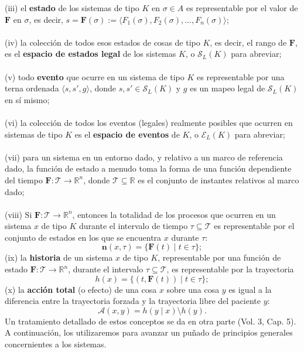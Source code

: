 {(iii) el \textbf{estado} de los sistemas de tipo $K$ en $\sigma \in A$ es representable por el valor de $\mathbf{F}$ en $\sigma$, es decir, $s = \mathbf{F}(\sigma) := \langle F_1(\sigma), F_2(\sigma), \ldots, F_n(\sigma) \rangle$;
\\\\
(iv) la colección de todos esos estados de cosas de tipo $K$, es decir, el rango de $\mathbf{F}$, es el \textbf{espacio de estados legal} de los sistemas $K$, o $\mathcal{S}_L(K)$ para abreviar;
\\\\
(v) todo \textbf{evento} que ocurre en un sistema de tipo $K$ es representable por una terna ordenada $\langle s, s', g \rangle$, donde $s, s' \in \mathcal{S}_L(K)$ y $g$ es un mapeo legal de $\mathcal{S}_L(K)$ en sí mismo;
\\\\
(vi) la colección de todos los eventos (legales) realmente posibles que ocurren en sistemas de tipo $K$ es el \textbf{espacio de eventos} de $K$, o $\mathcal{E}_L(K)$ para abreviar;
\\\\
(vii) para un sistema en un entorno dado, y relativo a un marco de referencia dado, la función de estado a menudo toma la forma de una función dependiente del tiempo $\mathbf{F}: \mathcal{T} \rightarrow \mathbb{R}^n$, donde $\mathcal{T} \subseteq \mathbb{R}$ es el conjunto de instantes relativos al marco dado;
\\\\
(viii) Si $\mathbf{F}: \mathcal{T} \rightarrow \mathbb{R}^n$, entonces la totalidad de los procesos que ocurren en un sistema $x$ de tipo $K$ durante el intervalo de tiempo $\tau \subseteq \mathcal{T}$ es representable por el conjunto de estados en los que se encuentra $x$ durante $\tau$:
$$ \mathbf{n}(x, \tau) = \{\mathbf{F}(t) \mid t \in \tau\}; $$
(ix) la \textbf{historia} de un sistema $x$ de tipo $K$, representable por una función de estado $\mathbf{F}: \mathcal{T} \rightarrow \mathbb{R}^n$, durante el intervalo $\tau \subseteq \mathcal{T}$, es representable por la trayectoria
$$ h(x) = \{(t, \mathbf{F}(t)) \mid t \in \tau\}; $$
(x) la \textbf{acción total} (o efecto) de una cosa $x$ sobre una cosa $y$ es igual a la diferencia entre la trayectoria forzada y la trayectoria libre del paciente $y$:
$$ \mathcal{A}(x, y) = h(y \mid x) \setminus h(y). $$
Un tratamiento detallado de estos conceptos se da en otra parte (Vol. 3, Cap. 5). A continuación, los utilizaremos para avanzar un puñado de principios generales concernientes a los sistemas.

}
